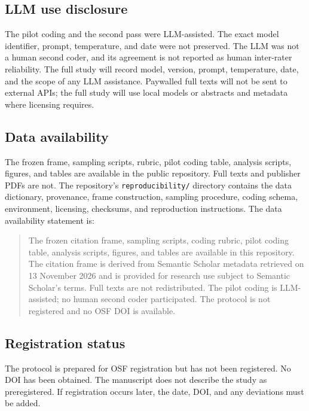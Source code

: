 \documentclass[11pt,a4paper]{article}
\begin{document}
\subsection{LLM use disclosure}

The pilot coding and the second pass were LLM-assisted. The exact model identifier, prompt, temperature, and date were not preserved. The LLM was not a human second coder, and its agreement is not reported as human inter-rater reliability. The full study will record model, version, prompt, temperature, date, and the scope of any LLM assistance. Paywalled full texts will not be sent to external APIs; the full study will use local models or abstracts and metadata where licensing requires.

\subsection{Data availability}

The frozen frame, sampling scripts, rubric, pilot coding table, analysis scripts, figures, and tables are available in the public repository. Full texts and publisher PDFs are not. The repository's \texttt{reproducibility/} directory contains the data dictionary, provenance, frame construction, sampling procedure, coding schema, environment, licensing, checksums, and reproduction instructions. The data availability statement is:

\begin{quote}
\small
The frozen citation frame, sampling scripts, coding rubric, pilot coding table, analysis scripts, figures, and tables are available in this repository. The citation frame is derived from Semantic Scholar metadata retrieved on 13 November 2026 and is provided for research use subject to Semantic Scholar's terms. Full texts are not redistributed. The pilot coding is LLM-assisted; no human second coder participated. The protocol is not registered and no OSF DOI is available.
\end{quote}

\subsection{Registration status}

The protocol is prepared for OSF registration but has not been registered. No DOI has been obtained. The manuscript does not describe the study as preregistered. If registration occurs later, the date, DOI, and any deviations must be added.
\end{document}
